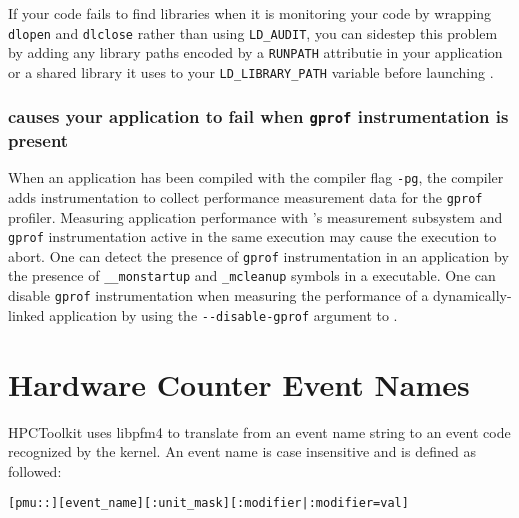  If your code fails to find libraries when it is monitoring your code by wrapping {\tt dlopen} and {\tt dlclose} rather than using \verb|LD_AUDIT|, you can sidestep this problem by adding any library paths encoded by a {\tt RUNPATH} attributie in your application or a shared library it uses to your \verb|LD_LIBRARY_PATH| variable before launching \hpcrun{}.
                      

\subsubsection{ \hpcrun{} causes your application to fail when {\tt gprof} instrumentation is present}

When an application has been compiled with the compiler flag \verb|-pg|,
the compiler adds instrumentation to collect performance measurement data for 
the \verb|gprof| profiler. Measuring application performance with 
\HPCToolkit{}'s measurement subsystem and \verb|gprof| instrumentation
active in the same execution may cause the execution
to abort. One can detect the presence of \verb|gprof| instrumentation in an
application by the presence of \verb|__monstartup| and \verb|_mcleanup| symbols 
in a executable.
One can disable \verb|gprof| instrumentation when measuring the performance of 
a dynamically-linked application by using the \verb|--disable-gprof| 
argument to \hpcrun{}.



\section{Hardware Counter Event Names}

HPCToolkit uses libpfm4\cite{libpfm-www} to translate from an event name string to an event code recognized by the kernel. 
An event name is case insensitive and is defined as followed:
\begin{verbatim}
[pmu::][event_name][:unit_mask][:modifier|:modifier=val] 
\end{verbatim}

